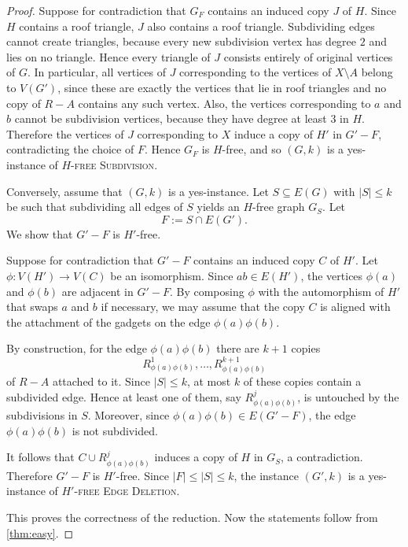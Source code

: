 \documentclass[a4paper,UKenglish,cleveref, autoref, thm-restate]{lipics-v2021}
\begin{document}
\begin{proof}
    Suppose for contradiction that $G_F$ contains an induced copy $J$ of $H$.
    Since $H$ contains a roof triangle, $J$ also contains a roof triangle.
    Subdividing edges cannot create triangles, because every new subdivision vertex has degree $2$ and lies on no triangle.
    Hence every triangle of $J$ consists entirely of original vertices of $G$.
    In particular, all vertices of $J$ corresponding to the vertices of $X\setminus A$ belong to $V(G')$, since these are exactly the vertices that lie in roof triangles and no copy of $R-A$ contains any such vertex.
    Also, the vertices corresponding to $a$ and $b$ cannot be subdivision vertices, because they have degree at least $3$ in $H$.
    Therefore the vertices of $J$ corresponding to $X$ induce a copy of $H'$ in $G'-F$, contradicting the choice of $F$.
    Hence $G_F$ is $H$-free, and so $(G,k)$ is a yes-instance of \textsc{$H$-free Subdivision}.

    Conversely, assume that $(G,k)$ is a yes-instance.
    Let $S\subseteq E(G)$ with $|S|\le k$ be such that subdividing all edges of $S$ yields an $H$-free graph $G_S$.
    Let
    \[
        F:=S\cap E(G').
    \]
    We show that $G'-F$ is $H'$-free.

    Suppose for contradiction that $G'-F$ contains an induced copy $C$ of $H'$.
    Let $\phi:V(H')\to V(C)$ be an isomorphism.
    Since $ab\in E(H')$, the vertices $\phi(a)$ and $\phi(b)$ are adjacent in $G'-F$.
    By composing $\phi$ with the automorphism of $H'$ that swaps $a$ and $b$ if necessary, we may assume that the copy $C$ is aligned with the attachment of the gadgets on the edge $\phi(a)\phi(b)$.

    By construction, for the edge $\phi(a)\phi(b)$ there are $k+1$ copies
    \[
        R_{\phi(a)\phi(b)}^1,\dots,R_{\phi(a)\phi(b)}^{k+1}
    \]
    of $R-A$ attached to it.
    Since $|S|\le k$, at most $k$ of these copies contain a subdivided edge.
    Hence at least one of them, say $R_{\phi(a)\phi(b)}^j$, is untouched by the subdivisions in $S$.
    Moreover, since $\phi(a)\phi(b)\in E(G'-F)$, the edge $\phi(a)\phi(b)$ is not subdivided.

    It follows that $C\cup R_{\phi(a)\phi(b)}^j$ induces a copy of $H$ in $G_S$, a contradiction.
    Therefore $G'-F$ is $H'$-free.
    Since $|F|\le |S|\le k$, the instance $(G',k)$ is a yes-instance of \textsc{$H'$-free Edge Deletion}.

    This proves the correctness of the reduction.
    Now the statements follow from \cref{thm:easy}.
\end{proof}
\end{document}
